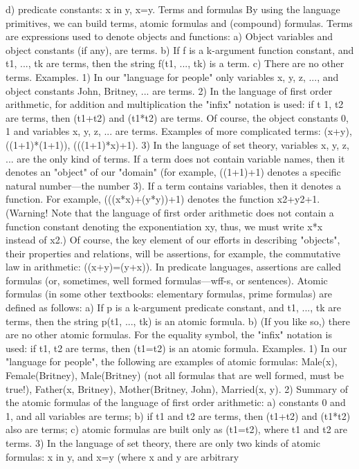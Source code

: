 d) predicate constants: x in y, x=y.
Terms and formulas
By using the language primitives, we can build terms, atomic formulas and (compound) formulas.
Terms are expressions used to denote objects and functions:
a) Object variables and object constants (if any), are terms.
b) If f is a k-argument function constant, and t1, ..., tk are terms, then the string f(t1, ..., tk) is a term.
c) There are no other terms.
Examples. 1) In our "language for people" only variables x, y, z, ..., and object constants John, Britney, ... are terms.
2) In the language of first order arithmetic, for addition and multiplication the "infix" notation is used: if t 1, t2 are terms, then
(t1+t2) and (t1*t2) are terms. Of course, the object constants 0, 1 and variables x, y, z, ... are terms. Examples of more
complicated terms: (x+y), ((1+1)*(1+1)), (((1+1)*x)+1).
3) In the language of set theory, variables x, y, z, ... are the only kind of terms.
If a term does not contain variable names, then it denotes an "object" of our "domain" (for example,
((1+1)+1) denotes a specific natural number---the number 3). If a term contains variables, then it denotes
a function. For example, (((x*x)+(y*y))+1) denotes the function x2+y2+1. (Warning! Note that the
language of first order arithmetic does not contain a function constant denoting the exponentiation xy,
thus, we must write x*x instead of x2.)
Of course, the key element of our efforts in describing "objects", their properties and relations, will be
assertions, for example, the commutative law in arithmetic: ((x+y)=(y+x)). In predicate languages,
assertions are called formulas (or, sometimes, well formed formulas---wff-s, or sentences).
Atomic formulas (in some other textbooks: elementary formulas, prime formulas) are defined as follows:
a) If p is a k-argument predicate constant, and t1, ..., tk are terms, then the string p(t1, ..., tk) is an atomic
formula.
b) (If you like so,) there are no other atomic formulas.
For the equality symbol, the "infix" notation is used: if t1, t2 are terms, then (t1=t2) is an atomic formula.
Examples. 1) In our "language for people", the following are examples of atomic formulas: Male(x), Female(Britney),
Male(Britney) (not all formulas that are well formed, must be true!), Father(x, Britney), Mother(Britney, John), Married(x, y).
2) Summary of the atomic formulas of the language of first order arithmetic: a) constants 0 and 1, and all variables are terms;
b) if t1 and t2 are terms, then (t1+t2) and (t1*t2) also are terms; c) atomic formulas are built only as (t1=t2), where t1 and t2 are
terms.
3) In the language of set theory, there are only two kinds of atomic formulas: x in y, and x=y (where x and y are arbitrary
